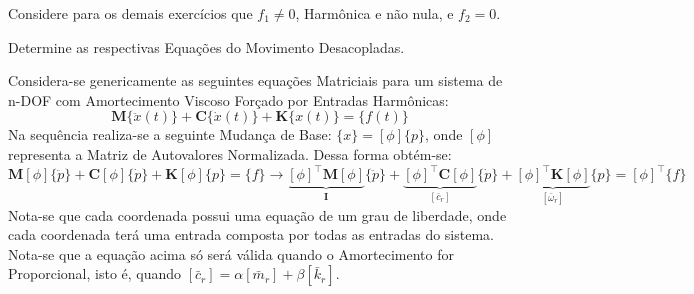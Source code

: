 \documentclass{article}
\begin{document}
\newpage\begin{exercise}\label{ex3}
    Considere para os demais exercícios que $f_1 \neq 0$, Harmônica e não nula, e $f_2 = 0$.
\end{exercise}
\begin{exercise}\label{ex4}
    Determine as respectivas Equações do Movimento Desacopladas.
\end{exercise}
\begin{resolution}
    Considera-se genericamente as seguintes equações Matriciais para um sistema de n-DOF com Amortecimento Viscoso Forçado por Entradas Harmônicas:
    \begin{equation}
        \mathbf{M}\{\ddot{x}(t)\} + \mathbf{C}\{\dot{x}(t)\} + \mathbf{K}\{x(t)\} = \{f(t)\}\label{eq:nDOFAF}
    \end{equation}
    Na sequência realiza-se a seguinte Mudança de Base: $\{x\} = [\phi] \{p\}$, onde $[\phi]$ representa a Matriz de Autovalores Normalizada. Dessa forma obtém-se:
    \begin{equation*}
        \mathbf{M}[\phi]\{\ddot{p}\} + \mathbf{C}[\phi]\{\dot{p}\} + \mathbf{K}[\phi]\{p\} = \{f\} \to
        \underbrace{[\phi]^\intercal\mathbf{M}[\phi]}_{\mathbf{I}}\{\ddot{p}\} + 
        \underbrace{[\phi]^\intercal\mathbf{C}[\phi]}_{[\bar{c}_{r}]}\{\dot{p}\} + 
        \underbrace{[\phi]^\intercal\mathbf{K}[\phi]}_{[\bar{\omega}_{r}]}\{p\} = 
        [\phi]^\intercal\{f\}
    \end{equation*}
    Nota-se que cada coordenada possui uma equação de um grau de liberdade, onde cada coordenada terá uma entrada composta por todas as entradas do sistema.\\

    Nota-se que a equação acima só será válida quando o Amortecimento for Proporcional, isto é, quando $[\bar{c}_r] = \alpha [\bar{m}_r] + \beta [\bar{k}_r]$.\\


\end{resolution}
\end{document}
